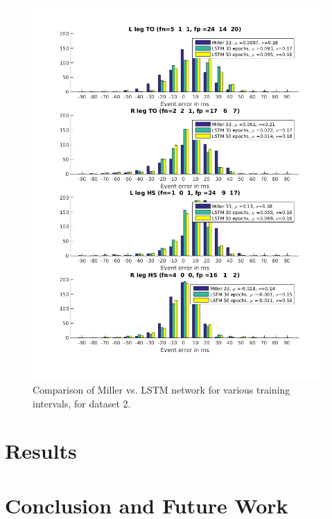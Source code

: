 \documentclass{acm_proc_article-sp}
\begin{document}
\begin{figure}[H]
 \centering
 \includegraphics[scale=.4]{./figures/Test2_2Train2_1Compare.png}
 \caption{Comparison of Miller vs. LSTM network for various training intervals, for dataset 2.}
 \label{fig:halfAndHalfTrials}
\end{figure}

\section{Results}
\label{sec:Results}

\section{Conclusion and Future Work}
\label{sec:Conclusion and Future Work}
\end{document}
